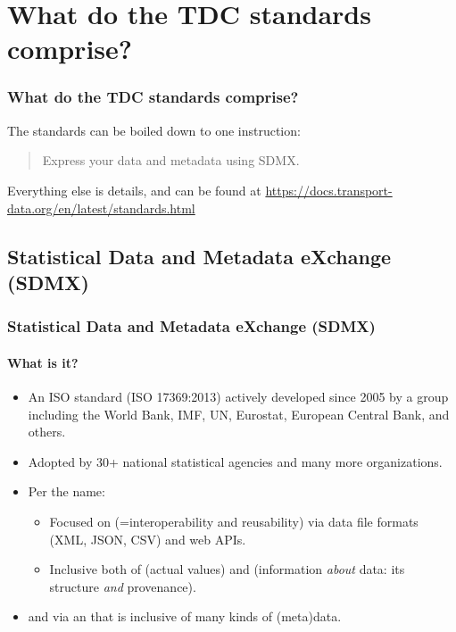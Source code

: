\documentclass[12pt,aspectratio=169]{beamer}
\begin{document}
\section{What do the TDC standards comprise?}
\begin{frame}
\frametitle{What do the TDC standards comprise?}

The standards can be boiled down to one instruction:

\medskip
\begin{quote}
   \large Express your data and metadata using SDMX.
\end{quote}

\bigskip
Everything else is details, and can be found at \url{https://docs.transport-data.org/en/latest/standards.html}

\end{frame}

\subsection{Statistical Data and Metadata eXchange (SDMX)}

\begin{frame}
\frametitle{Statistical Data and Metadata eXchange (SDMX)}
\framesubtitle{What is it?}

\begin{itemize}
  \item An ISO standard (ISO 17369:2013) actively developed since 2005 by a group including the World Bank, IMF, UN, Eurostat, European Central Bank, and others.
  \item Adopted by 30+ national statistical agencies and many more organizations.
  \item Per the name:
    \begin{itemize}
      \item Focused on  (=interoperability and reusability) via data file formats (XML, JSON, CSV) and web APIs.
      \item Inclusive both of  (actual values) and  (information \emph{about} data: its structure \emph{and} provenance).
    \end{itemize}
  \item {} and  via an  that is inclusive of many kinds of (meta)data.
\end{itemize}
\end{frame}
\end{document}
